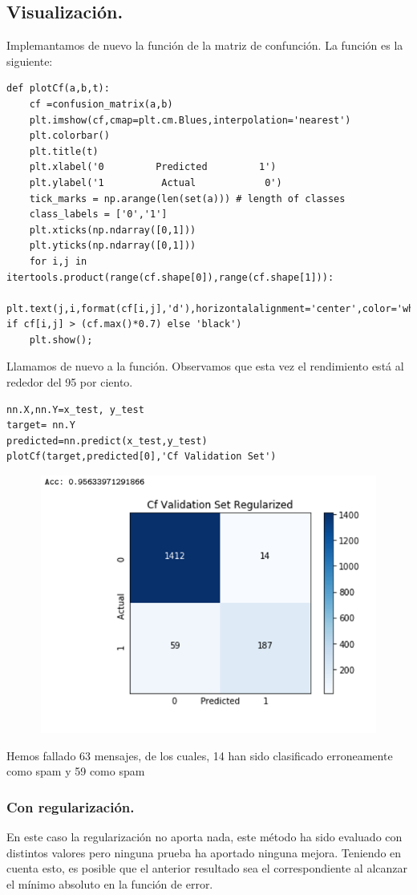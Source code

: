 \documentclass[a4paper,10pt]{article}
\begin{document}
\subsection{Visualización.}
Implemantamos de nuevo la función de la matriz de confunción. La función es la siguiente:
\begin{lstlisting}
def plotCf(a,b,t):
    cf =confusion_matrix(a,b)
    plt.imshow(cf,cmap=plt.cm.Blues,interpolation='nearest')
    plt.colorbar()
    plt.title(t)
    plt.xlabel('0         Predicted         1')
    plt.ylabel('1          Actual            0')
    tick_marks = np.arange(len(set(a))) # length of classes
    class_labels = ['0','1']
    plt.xticks(np.ndarray([0,1]))
    plt.yticks(np.ndarray([0,1]))
    for i,j in itertools.product(range(cf.shape[0]),range(cf.shape[1])):
        plt.text(j,i,format(cf[i,j],'d'),horizontalalignment='center',color='white' if cf[i,j] > (cf.max()*0.7) else 'black')
    plt.show();
\end{lstlisting}
Llamamos de nuevo a la función. Observamos que esta vez el rendimiento está al rededor del 95 por ciento.
\begin{lstlisting}
nn.X,nn.Y=x_test, y_test 
target= nn.Y
predicted=nn.predict(x_test,y_test) 
plotCf(target,predicted[0],'Cf Validation Set')
\end{lstlisting}
\begin{figure}[H]
\centering
\includegraphics[width=12.0cm, height=8.5cm]{Annotation 2020-03-23 161410}
\end{figure}
Hemos fallado 63 mensajes, de los cuales, 14 han sido clasificado erroneamente como spam y 59 como spam
\subsubsection{Con regularización.}
En este caso la regularización no aporta nada, este método ha sido evaluado con distintos valores pero ninguna prueba ha aportado ninguna mejora. Teniendo en cuenta esto, es posible que el anterior resultado sea el correspondiente al alcanzar el mínimo absoluto en la función de error.
\end{document}
